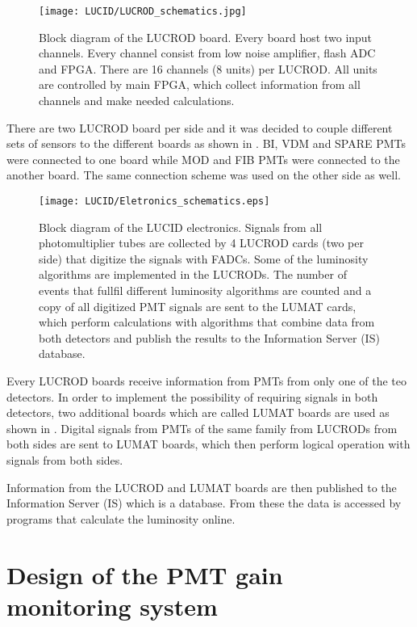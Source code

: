 \begin{figure}
\centering
\texttt{[image: LUCID/LUCROD\_schematics.jpg]}
\caption{Block diagram of the LUCROD board. Every board host two input channels. Every channel consist from low noise amplifier, flash ADC and FPGA. 
There are 16 channels (8 units) per LUCROD. All units are controlled by main FPGA, which collect information from all channels and make needed calculations.}
\label{fig:LUCROD_schematics}
\end{figure}

There are two LUCROD board per side and it was decided to couple different sets of sensors to the different boards as shown in 
.
BI, VDM and SPARE PMTs were connected to one board while MOD and FIB PMTs were connected to the another board.
The same connection scheme was used on the other side as well.

\begin{figure}
\centering
\texttt{[image: LUCID/Eletronics\_schematics.eps]}
\caption{Block diagram of the LUCID electronics. Signals from all photomultiplier tubes are collected by 4 \mbox{LUCROD} cards 
(two per side) that digitize the signals with FADCs. Some of the luminosity algorithms are implemented in the LUCRODs. 
The number of events that fullfil different luminosity algorithms are counted and a copy of all digitized PMT 
signals are sent to the LUMAT cards, which perform calculations with algorithms that combine data from 
both detectors and publish the results to the Information Server (IS) database.}
\label{fig:Eletronics_schematics}
\end{figure}

Every LUCROD boards receive information from PMTs from only one of the teo detectors.
In order to implement the possibility of requiring signals in both detectors, two additional boards which are called LUMAT boards are used
as shown in .
Digital signals from PMTs of the same family from LUCRODs from both sides are sent to LUMAT boards, 
which then perform logical operation with signals from both sides.

Information from the LUCROD and LUMAT boards are then published to the Information Server (IS) which is a database.
From these the data is accessed by programs that calculate the luminosity online.

\section{Design of the PMT gain monitoring system}

